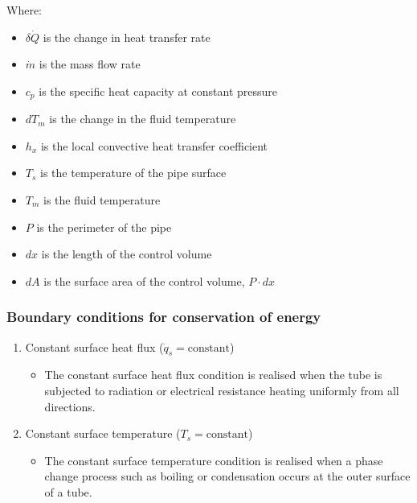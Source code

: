 \documentclass[11pt]{article}
\begin{document}
Where:
\begin{itemize}
\item \(\delta \dot{Q}\) is the change in heat transfer rate
\item \(\dot{m}\) is the mass flow rate
\item \(c_p\) is the specific heat capacity at constant pressure
\item \(dT_m\) is the change in the fluid temperature
\item \(h_x\) is the local convective heat transfer coefficient
\item \(T_s\) is the temperature of the pipe surface
\item \(T_m\) is the fluid temperature
\item \(P\) is the perimeter of the pipe
\item \(dx\) is the length of the control volume
\item \(dA\) is the surface area of the control volume, \(P \cdot dx\)
\end{itemize}

\subsubsection{Boundary conditions for conservation of energy}
\label{sec:orgb617179}
\begin{enumerate}
\item Constant surface heat flux (\(\dot{q}_s = \text{constant}\))
\begin{itemize}
\item The constant surface heat flux condition is realised when the tube is subjected to radiation or electrical resistance heating uniformly from all directions.
\end{itemize}
\item Constant surface temperature (\(T_s = \text{constant}\))
\begin{itemize}
\item The constant surface temperature condition is realised when a phase change process such as boiling or condensation occurs at the outer surface of a tube.
\end{itemize}
\end{enumerate}
\end{document}
